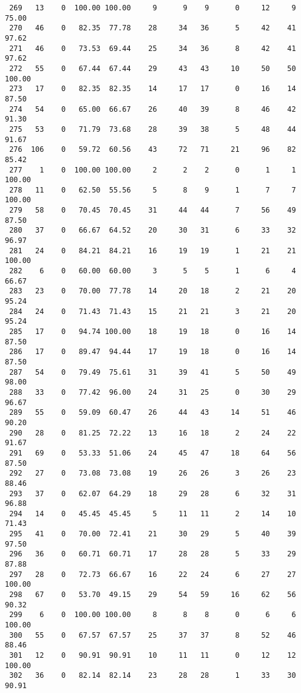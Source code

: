 \begin{verbatim}
 269   13    0  100.00 100.00     9      9    9      0     12     9    75.00
 270   46    0   82.35  77.78    28     34   36      5     42    41    97.62
 271   46    0   73.53  69.44    25     34   36      8     42    41    97.62
 272   55    0   67.44  67.44    29     43   43     10     50    50   100.00
 273   17    0   82.35  82.35    14     17   17      0     16    14    87.50
 274   54    0   65.00  66.67    26     40   39      8     46    42    91.30
 275   53    0   71.79  73.68    28     39   38      5     48    44    91.67
 276  106    0   59.72  60.56    43     72   71     21     96    82    85.42
 277    1    0  100.00 100.00     2      2    2      0      1     1   100.00
 278   11    0   62.50  55.56     5      8    9      1      7     7   100.00
 279   58    0   70.45  70.45    31     44   44      7     56    49    87.50
 280   37    0   66.67  64.52    20     30   31      6     33    32    96.97
 281   24    0   84.21  84.21    16     19   19      1     21    21   100.00
 282    6    0   60.00  60.00     3      5    5      1      6     4    66.67
 283   23    0   70.00  77.78    14     20   18      2     21    20    95.24
 284   24    0   71.43  71.43    15     21   21      3     21    20    95.24
 285   17    0   94.74 100.00    18     19   18      0     16    14    87.50
 286   17    0   89.47  94.44    17     19   18      0     16    14    87.50
 287   54    0   79.49  75.61    31     39   41      5     50    49    98.00
 288   33    0   77.42  96.00    24     31   25      0     30    29    96.67
 289   55    0   59.09  60.47    26     44   43     14     51    46    90.20
 290   28    0   81.25  72.22    13     16   18      2     24    22    91.67
 291   69    0   53.33  51.06    24     45   47     18     64    56    87.50
 292   27    0   73.08  73.08    19     26   26      3     26    23    88.46
 293   37    0   62.07  64.29    18     29   28      6     32    31    96.88
 294   14    0   45.45  45.45     5     11   11      2     14    10    71.43
 295   41    0   70.00  72.41    21     30   29      5     40    39    97.50
 296   36    0   60.71  60.71    17     28   28      5     33    29    87.88
 297   28    0   72.73  66.67    16     22   24      6     27    27   100.00
 298   67    0   53.70  49.15    29     54   59     16     62    56    90.32
 299    6    0  100.00 100.00     8      8    8      0      6     6   100.00
 300   55    0   67.57  67.57    25     37   37      8     52    46    88.46
 301   12    0   90.91  90.91    10     11   11      0     12    12   100.00
 302   36    0   82.14  82.14    23     28   28      1     33    30    90.91

\end{verbatim}
